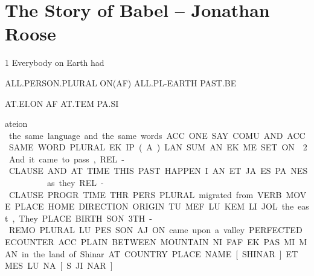 
\section{The Story of Babel -- {\small Jonathan Roose}}

1 Everybody		on 	Earth 		had

ALL.PERSON.PLURAL   	ON(AF)	ALL.PL-EARTH	PAST.BE	 

AT.EI.ON		AF	AT.TEM		PA.SI	 

ateion		\af	\at\tem		\pa\si	 

\vspace{0.2cm}

the same language	 and 	the same words. 

ACC.ONE.SAY.COMU.	AND.	ACC.SAME.WORD.PLURAL 

EK.IP.(A).LAN.SUM	AN	EK.ME.SET.ON

\vspace{0.5cm}

2 And	 		it came to pass, 			  

REL-CLAUSE.AND            AT.TIME.THIS.PAST.HAPPEN.		

I.AN			ET.JA.ES.PA.NES				 

\Atlani\an                    \et\ja\es\pa\nes

\def\drie{\vspace{0.3cm}}
\drie

as	they	    

REL-CLAUSE.PROGR.TIME	THR.PERS.PLURAL 



migrated          			from      		 VERB.MOVE.PLACE.HOME	DIRECTION.ORIGIN	 

TU.MEF.LU.KEM			LI.JOL 

 

the east, 		They 		 

PLACE.BIRTH.SON	3TH-REMO.PLURAL 

LU.PES.SON		AJ.ON 

  

came upon 		a valley                 

PERFECTED.ECOUNTER  	ACC.PLAIN.BETWEEN.MOUNTAIN.	NI.FAF                                EK.PAS.MI.MAN 

  

in the land          of Shinar 

AT.COUNTRY	PLACE.NAME.[SHINAR] 

ET.MES		LU.NA.[S.JI.NAR] 

  

